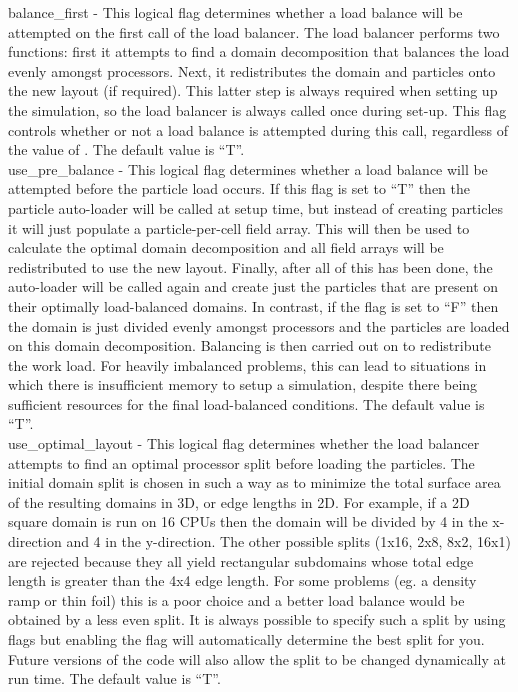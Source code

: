 {\emphtext balance\_first} - This logical flag determines whether a load balance
  will be attempted on the first call of the load balancer.
  The load balancer performs two functions: first it attempts to find a
  domain decomposition that balances the load evenly amongst processors.
  Next, it redistributes the domain and particles onto the new layout (if
  required). This latter step is always required when setting up the
  simulation, so the load balancer is always called once during set-up.
  This flag controls whether or not a load balance is attempted during
  this call, regardless of the value of .
  The default value is ``T''.\\

{\emphtext use\_pre\_balance} - This logical flag determines whether a load
  balance will be attempted before the particle load occurs. If this flag is
  set to ``T'' then the particle auto-loader will be called at setup time, but
  instead of creating particles it will just populate a particle-per-cell field
  array. This will then be used to calculate the optimal domain decomposition
  and all field arrays will be redistributed to use the new layout. Finally,
  after all of this has been done, the auto-loader will be called again and
  create just the particles that are present on their optimally load-balanced
  domains. In contrast, if the flag is set to ``F'' then the domain is just
  divided evenly amongst processors and the particles are loaded on this domain
  decomposition. Balancing is then carried out on to redistribute the work load.
  For heavily imbalanced problems, this can lead to situations in which there is
  insufficient memory to setup a simulation, despite there being sufficient
  resources for the final load-balanced conditions. The default value is
  ``T''.\\

{\emphtext use\_optimal\_layout} - This logical flag determines whether the
  load balancer attempts to find an optimal processor split before loading
  the particles. The initial domain split is chosen in such a way as to
  minimize the total surface area of the resulting domains in 3D, or edge
  lengths in 2D. For example, if a 2D square domain is run on 16 CPUs then the
  domain will be divided by 4 in the x-direction and 4 in the y-direction. The
  other possible splits (1x16, 2x8, 8x2, 16x1) are rejected because they all
  yield rectangular subdomains whose total edge length is greater than the
  4x4 edge length. For some problems (eg. a density ramp or thin foil) this is
  a poor choice and a better load balance would be obtained by a less even
  split. It is always possible to specify such a split by using
   flags but enabling the
   flag will automatically determine the best
  split for you. Future versions of the code will also allow the split to be
  changed dynamically at run time.  The default value is ``T''.\\

